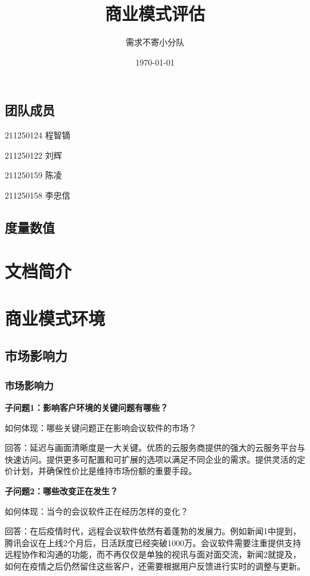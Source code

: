 \documentclass[a4paper,12pt]{article}
\title{商业模式评估}
\author{需求不寄小分队}
\date{\today}
\begin{document}
    \maketitle

    \tableofcontents


    \subsection{团队成员}
    211250124 程智镝

    211250122 刘辉

    211250159 陈凌

    211250158 李忠信
    \subsection{度量数值}

    \section{文档简介}
    

    \section{商业模式环境}
    \subsection{市场影响力}
    \subsubsection{市场影响力}
    \textbf{子问题1：影响客户环境的关键问题有哪些？}
    
    如何体现：哪些关键问题正在影响会议软件的市场？
    
    回答：延迟与画⾯清晰度是⼀⼤关键。优质的云服务商提供的强⼤的云服务平台与快速访问。提供更多可配置和可扩展的选项以满足不同企业的需求。提供灵活的定价计划，并确保性价比是维持市场份额的重要手段。
    
    \textbf{子问题2：哪些改变正在发生？}

    如何体现：当今的会议软件正在经历怎样的变化？

    回答：在后疫情时代，远程会议软件依然有着蓬勃的发展力。例如新闻1中提到，腾讯会议在上线2个⽉后，⽇活跃度已经突破1000万。会议软件需要注重提供支持远程协作和沟通的功能，而不再仅仅是单独的视讯与⾯对⾯交流，新闻2就提及，如何在疫情之后仍然留住这些客户，还需要根据⽤户反馈进⾏实时的调整与更新。
\end{document}
